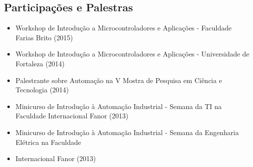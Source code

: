 \documentclass[11pt,a4paper,sans]{moderncv}
\begin{document}
\begin{samepage}
	\section{Participações e Palestras}
	\begin{itemize}[itemsep=0cm, leftmargin=0.6cm, label={\textbullet}]
		\item Workshop de Introdução a Microcontroladores e Aplicações - Faculdade Farias Brito (2015)
		\item Workshop de Introdução a Microcontroladores e Aplicações - Universidade de Fortaleza (2014)
		\item Palestrante sobre Automação na V Mostra de Pesquisa em Ciência e Tecnologia (2014)
		\item Minicurso de Introdução à Automação Industrial - Semana da TI na Faculdade Internacional Fanor (2013)
		\item Minicurso de Introdução à Automação Industrial - Semana da Engenharia Elétrica na Faculdade
		\item Internacional Fanor (2013)
	\end{itemize}
\end{samepage}
\vspace{\baselineskip}

\fancyfoot{} %
\end{document}
